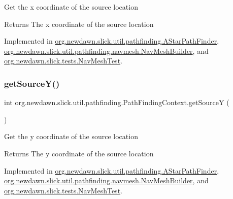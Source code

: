 Get the x coordinate of the source location

\begin{DoxyReturn}{Returns}
The x coordinate of the source location 
\end{DoxyReturn}


Implemented in \mbox{\hyperlink{classorg_1_1newdawn_1_1slick_1_1util_1_1pathfinding_1_1_a_star_path_finder_a170c66a9356c930fa83a50567f64be52}{org.\+newdawn.\+slick.\+util.\+pathfinding.\+A\+Star\+Path\+Finder}}, \mbox{\hyperlink{classorg_1_1newdawn_1_1slick_1_1util_1_1pathfinding_1_1navmesh_1_1_nav_mesh_builder_a368af4ad284ad517158244a34f6111a5}{org.\+newdawn.\+slick.\+util.\+pathfinding.\+navmesh.\+Nav\+Mesh\+Builder}}, and \mbox{\hyperlink{classorg_1_1newdawn_1_1slick_1_1tests_1_1_nav_mesh_test_af3706d73f28af86dd69006f8095f76ef}{org.\+newdawn.\+slick.\+tests.\+Nav\+Mesh\+Test}}.

\mbox{\label{interfaceorg_1_1newdawn_1_1slick_1_1util_1_1pathfinding_1_1_path_finding_context_a30ac68532d0f3e9e5f4ce5e5e88f593e}} 
\subsubsection{\texorpdfstring{get\+Source\+Y()}{getSourceY()}}
{\footnotesize\ttfamily int org.\+newdawn.\+slick.\+util.\+pathfinding.\+Path\+Finding\+Context.\+get\+SourceY (\begin{DoxyParamCaption}{ }\end{DoxyParamCaption})}

Get the y coordinate of the source location

\begin{DoxyReturn}{Returns}
The y coordinate of the source location 
\end{DoxyReturn}


Implemented in \mbox{\hyperlink{classorg_1_1newdawn_1_1slick_1_1util_1_1pathfinding_1_1_a_star_path_finder_abfd761f71fe0c43a7d3533e49cf5be33}{org.\+newdawn.\+slick.\+util.\+pathfinding.\+A\+Star\+Path\+Finder}}, \mbox{\hyperlink{classorg_1_1newdawn_1_1slick_1_1util_1_1pathfinding_1_1navmesh_1_1_nav_mesh_builder_af86bf1e346eb82762f69a1d4de6ba315}{org.\+newdawn.\+slick.\+util.\+pathfinding.\+navmesh.\+Nav\+Mesh\+Builder}}, and \mbox{\hyperlink{classorg_1_1newdawn_1_1slick_1_1tests_1_1_nav_mesh_test_a97359fb033667ef886d266231204adcf}{org.\+newdawn.\+slick.\+tests.\+Nav\+Mesh\+Test}}.

